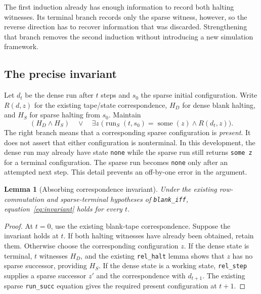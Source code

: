 \documentclass[11pt]{article}
\newtheorem{lemma}[theorem]{Lemma}
\begin{document}
The first induction already has enough information to record both halting witnesses. Its terminal branch records only the sparse witness, however, so the reverse direction has to recover information that was discarded. Strengthening that branch removes the second induction without introducing a new simulation framework.

\subsection{The precise invariant}

Let $d_t$ be the dense run after $t$ steps and $s_0$ the sparse initial configuration. Write $R(d,z)$ for the existing tape/state correspondence, $H_D$ for dense blank halting, and $H_S$ for sparse halting from $s_0$. Maintain
\begin{equation}\label{eq:invariant}
  (H_D\land H_S)
  \quad\lor\quad
  \exists z\;\bigl(\operatorname{run}_S(t,s_0)=\operatorname{some}(z)
                    \land R(d_t,z)\bigr).
\end{equation}
The right branch means that a corresponding sparse configuration is \emph{present}. It does not assert that either configuration is nonterminal. In this development, the dense run may already have state \texttt{none} while the sparse run still returns \texttt{some z} for a terminal configuration. The sparse run becomes \texttt{none} only after an attempted next step. This detail prevents an off-by-one error in the argument.

\begin{lemma}[Absorbing correspondence invariant]
Under the existing row-commutation and sparse-terminal hypotheses of \texttt{blank\_iff}, equation~\eqref{eq:invariant} holds for every $t$.
\end{lemma}

\begin{proof}
At $t=0$, use the existing blank-tape correspondence. Suppose the invariant holds at $t$. If both halting witnesses have already been obtained, retain them. Otherwise choose the corresponding configuration $z$. If the dense state is terminal, $t$ witnesses $H_D$, and the existing \texttt{rel\_halt} lemma shows that $z$ has no sparse successor, providing $H_S$. If the dense state is a working state, \texttt{rel\_step} supplies a sparse successor $z'$ and the correspondence with $d_{t+1}$. The existing sparse \texttt{run\_succ} equation gives the required present configuration at $t+1$.
\end{proof}
\end{document}
